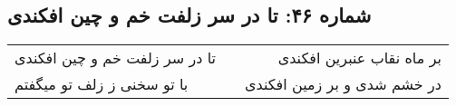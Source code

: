 \begin{center}
\section*{شماره ۴۶: تا در سر زلفت خم و چین افکندی}
\label{sec:046}
\begin{longtable}{l p{0.5cm} r}
تا در سر زلفت خم و چین افکندی
&&
بر ماه نقاب عنبرین افکندی
\\
با تو سخنی ز زلف تو میگفتم
&&
در خشم شدی و بر زمین افکندی
\\
\end{longtable}
\end{center}
